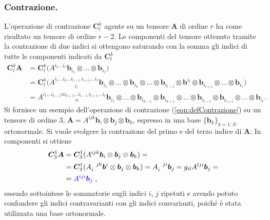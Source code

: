  \subsubsection{Contrazione.} L'operazione di contrazione $\bm{C}^k_l$ agente su un tensore $\bm{A}$ di ordine $r$ ha come risultato un tensore di ordine $r-2$. Le componenti del tensore ottenuto tramite la contrazione di due indici si ottengono saturando con la somma gli indici di tutte le componenti indicati da $\bm{C}^k_l$
\begin{equation}\label{eqn:defContrazione}
\begin{aligned}
 \bm{C}^k_l \bm{A} & =
 \bm{C}^k_l \big(A^{i_1 \dots i_r} \bm{b}_{i_1} \otimes \dots \otimes \bm{b}_{i_r}\big) \\
 & = \bm{C}^k_l \big(A^{i_1 \dots i_k \dots i_{l-1} \ i_{l+1} \dots i_r}_{\qquad \quad \quad i_l} \bm{b}_{i_1} \otimes \dots \otimes \bm{b}_{i_k} \otimes \dots \otimes \bm{b}_{i_{l-1}} \otimes  \bm{b}^{i_l} \otimes \bm{b}_{i_{l+1}} \otimes \dots \otimes \bm{b}_{i_r}\big) \\
 & = A^{i_1 \dots i_{k-1} n i_{k+1} \dots i_{l-1} \ i_{l+1} \dots i_r}_{\qquad \qquad \quad \quad \ \ n} \bm{b}_{i_1} \otimes \dots \otimes \bm{b}_{i_{k-1}} \otimes \bm{b}_{i_{k+1}} \otimes \dots \otimes \bm{b}_{i_{l-1}} \otimes \bm{b}_{i_{l+1}} \otimes \dots \otimes \bm{b}_{i_r} .
\end{aligned}
\end{equation}
Si fornisce un esempio dell'operazione di contrazione (\ref{eqn:defContrazione}) su un tensore di ordine 3, $\bm{A} = A^{ijk} \bm{b}_i \otimes \bm{b}_j \otimes \bm{b}_k$, espresso in una base $\{\bm{b}_k\}_{k=1:N}$ ortonormale.
  Si vuole svolgere la contrazione del primo e del terzo indice di $\bm{A}$. In componenti si ottiene
  \begin{equation}
  \begin{aligned}
   \bm{C}^1_3 \bm{A}
   & = \bm{C}^1_3 ( A^{ijk} \bm{b}_i \otimes \bm{b}_j \otimes \bm{b}_k ) = \\
   & =\bm{C}^1_3 ( A_i^{\ \ jk} \bm{b}^i \otimes \bm{b}_j \otimes \bm{b}_k ) = A_i^{\ \ ji} \bm{b}_j = g_{il} A^{lji} \bm{b}_j = \\
   & = {\color{blue} A^{iji} \bm{b}_j } \ ,
  \end{aligned}
  \end{equation}
 essendo sottointese le sommatorie sugli indici $i$, $j$ ripetuti e avendo potuto confondere gli indici contravarianti con gli indici convarianti, poiché è stata utilizzata una base ortonormale.
  
